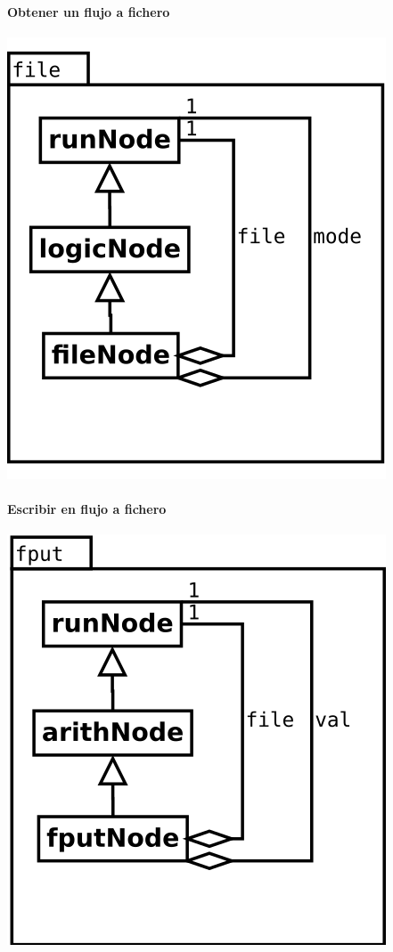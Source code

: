 \begin{multicols}{2}
   \paragraph {Obtener un flujo a fichero} 
   \begin{center}
   \includegraphics[scale=0.4]{file.png} \\
   \end{center}

   \paragraph {Escribir en flujo a fichero} 
   \begin{center}
   \includegraphics[scale=0.4]{fput.png} \\
   \end{center}


\end{multicols}
